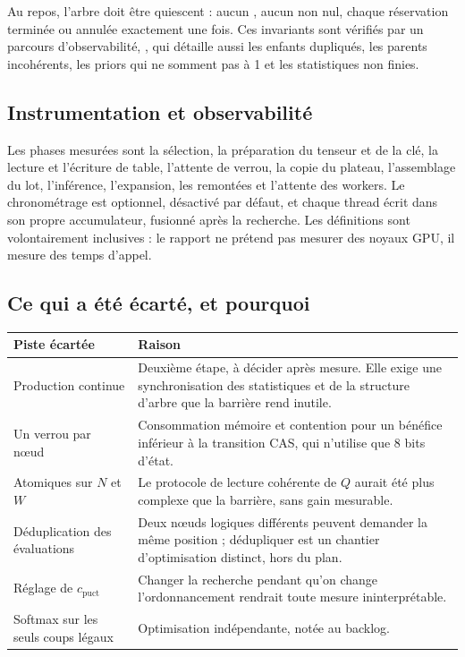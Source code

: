 Au repos, l'arbre doit \^etre quiescent : aucun , aucun
 non nul, chaque r\'eservation termin\'ee ou annul\'ee
exactement une fois. Ces invariants sont v\'erifi\'es par un parcours
d'observabilit\'e, , qui d\'etaille aussi les enfants
dupliqu\'es, les parents incoh\'erents, les priors qui ne somment pas \`a 1 et
les statistiques non finies.

\subsection{Instrumentation et observabilit\'e}

Les phases mesur\'ees sont la s\'election, la pr\'eparation du tenseur et de
la cl\'e, la lecture et l'\'ecriture de table, l'attente de verrou, la copie
du plateau, l'assemblage du lot, l'inf\'erence, l'expansion, les remont\'ees
et l'attente des workers. Le chronom\'etrage est optionnel, d\'esactiv\'e par
d\'efaut, et chaque thread \'ecrit dans son propre accumulateur, fusionn\'e
apr\`es la recherche. Les d\'efinitions sont volontairement inclusives : le
rapport ne pr\'etend pas mesurer des noyaux GPU, il mesure des temps d'appel.

\subsection{Ce qui a \'et\'e \'ecart\'e, et pourquoi}

\begin{center}
\small
\begin{tabular}{p{4.2cm}p{10.5cm}}
\toprule
Piste \'ecart\'ee & Raison \\
\midrule
Production continue & Deuxi\`eme \'etape, \`a d\'ecider apr\`es mesure. Elle
exige une synchronisation des statistiques et de la structure d'arbre que la
barri\`ere rend inutile. \\
Un verrou par n\oe{}ud & Consommation m\'emoire et contention pour un
b\'en\'efice inf\'erieur \`a la transition CAS, qui n'utilise que 8 bits
d'\'etat. \\
Atomiques sur $N$ et $W$ & Le protocole de lecture coh\'erente de $Q$ aurait
\'et\'e plus complexe que la barri\`ere, sans gain mesurable. \\
D\'eduplication des \'evaluations & Deux n\oe{}uds logiques diff\'erents
peuvent demander la m\^eme position ; d\'edupliquer est un chantier
d'optimisation distinct, hors du plan. \\
R\'eglage de $c_{\text{puct}}$ & Changer la recherche pendant qu'on change
l'ordonnancement rendrait toute mesure ininterpr\'etable. \\
Softmax sur les seuls coups l\'egaux & Optimisation ind\'ependante, not\'ee au
backlog. \\
\bottomrule
\end{tabular}
\end{center}
